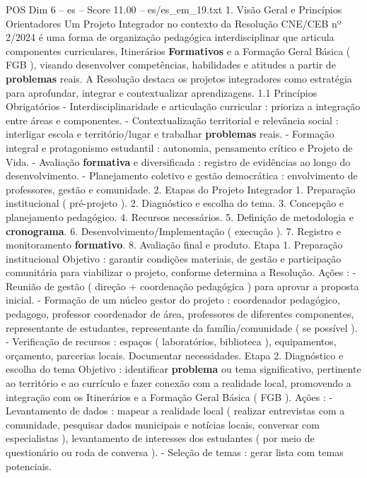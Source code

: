 \begin{textsample}{POS Dim 6 – es – Score 11.00 – es/es\_em\_19.txt}  \label{ex:f6_pos_142}
1.
Visão Geral e Princípios Orientadores Um Projeto Integrador no contexto da Resolução CNE/CEB nº 2/2024 é uma forma de organização pedagógica interdisciplinar que articula componentes curriculares, Itinerários \textbf{Formativos} e a Formação Geral Básica ( FGB ), visando desenvolver competências, habilidades e atitudes a partir de \textbf{problemas} reais.
A Resolução destaca os projetos integradores como estratégia para aprofundar, integrar e contextualizar aprendizagens. 1.1 Princípios Obrigatórios - Interdisciplinaridade e articulação curricular : prioriza a integração entre áreas e componentes. - Contextualização territorial e relevância social : interligar escola e território/lugar e trabalhar \textbf{problemas} reais. - Formação integral e protagonismo estudantil : autonomia, pensamento crítico e Projeto de Vida. - Avaliação \textbf{formativa} e diversificada : registro de evidências ao longo do desenvolvimento. - Planejamento coletivo e gestão democrática : envolvimento de professores, gestão e comunidade. 2.
Etapas do Projeto Integrador 1.
Preparação institucional ( pré-projeto ). 2.
Diagnóstico e escolha do tema. 3.
Concepção e planejamento pedagógico. 4.
Recursos necessários. 5.
Definição de metodologia e \textbf{cronograma}. 6.
Desenvolvimento/Implementação ( execução ). 7.
Registro e monitoramento \textbf{formativo}. 8.
Avaliação final e produto.
Etapa 1.
Preparação institucional Objetivo : garantir condições materiais, de gestão e participação comunitária para viabilizar o projeto, conforme determina a Resolução.
Ações : - Reunião de gestão ( direção + coordenação pedagógica ) para aprovar a proposta inicial. - Formação de um núcleo gestor do projeto : coordenador pedagógico, pedagogo, professor coordenador de área, professores de diferentes componentes, representante de estudantes, representante da família/comunidade ( se possível ). - Verificação de recursos : espaços ( laboratórios, biblioteca ), equipamentos, orçamento, parcerias locais.
Documentar necessidades.
Etapa 2.
Diagnóstico e escolha do tema Objetivo : identificar \textbf{problema} ou tema significativo, pertinente ao território e ao currículo e fazer conexão com a realidade local, promovendo a integração com os Itinerários e a Formação Geral Básica ( FGB ).
Ações : - Levantamento de dados : mapear a realidade local ( realizar entrevistas com a comunidade, pesquisar dados municipais e notícias locais, conversar com especialistas ), levantamento de interesses dos estudantes ( por meio de questionário ou roda de conversa ). - Seleção de temas : gerar lista com temas potenciais.

\end{textsample}
